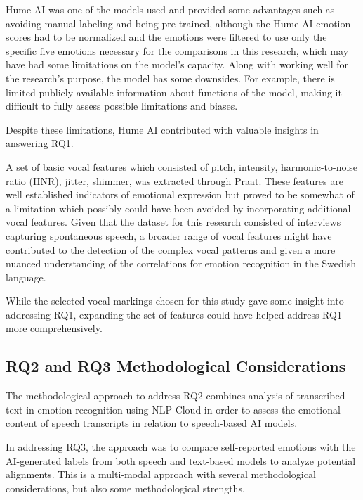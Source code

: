 Hume AI was one of the models used and provided some advantages such as avoiding manual labeling and being pre-trained, although the Hume AI emotion scores had to be normalized and the emotions were filtered to use only the specific five emotions necessary for the comparisons in this research, which may have had some limitations on the model’s capacity. Along with working well for the research’s purpose, the model has some downsides. For example, there is limited publicly available information about functions of the model, making it difficult to fully assess possible limitations and biases.

Despite these limitations, Hume AI contributed with valuable insights in answering RQ1. 

A set of basic vocal features which consisted of pitch, intensity, harmonic-to-noise ratio (HNR), jitter, shimmer, was extracted through Praat. These features are well established indicators of emotional expression but proved to be somewhat of a limitation which possibly could have been avoided by incorporating additional vocal features. Given that the dataset for this research consisted of interviews capturing spontaneous speech, a broader range of vocal features might have contributed to the detection of the complex vocal patterns and given a more nuanced understanding of the correlations for emotion recognition in the Swedish language.

While the selected vocal markings chosen for this study gave some insight into addressing RQ1, expanding the set of features could have helped address RQ1 more comprehensively. 

\subsection{RQ2 and RQ3 Methodological Considerations}
The methodological approach to address RQ2 combines analysis of transcribed text in emotion recognition using NLP Cloud in order to assess the emotional content of speech transcripts in relation to speech-based AI models.

In addressing RQ3, the approach was to compare self-reported emotions with the AI-generated labels from both speech and text-based models to analyze potential alignments.
This is a multi-modal approach with several methodological considerations, but also some methodological strengths.

